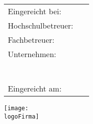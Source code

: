 \begin{titlepage}
\begin{addmargin}[-0.5cm]{0cm}
\begin{tabular}[h]{ll}
  				Eingereicht bei:&	\\
  				Hochschulbetreuer:	&	\hochschulbetreuer	\\
  				Fachbetreuer:	&	\unternehmensbetreuer	\\
  				Unternehmen:	& 	\firma \\
  								& 	\strasse \\
  								& 	\plz \ \ort \\
  								\\
  				Eingereicht am:	& 	\abgabeDatum%
			\end{tabular}
					
					
			\vspace{10mm}
			
			
			\begin{flushright}
					\texttt{[image: \\logoFirma]}
			\end{flushright}
							

	 


\end{addmargin}


\end{titlepage}
